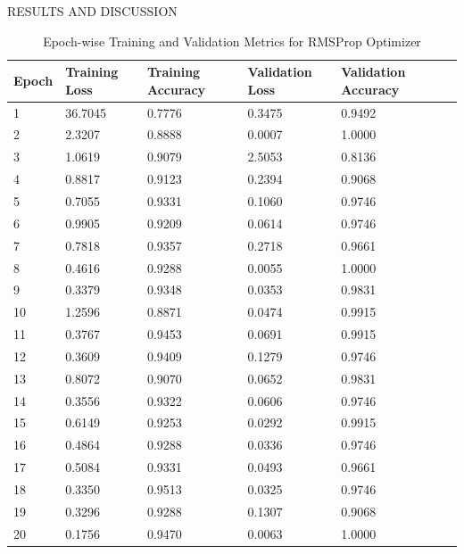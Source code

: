 \begin{section}[]{\uppercase{Results and Discussion}}
\begin{table}[H]
\centering
\begin{tabular}{llllll}
\toprule
\textbf{Epoch} & \textbf{Training Loss} & \textbf{Training Accuracy} & \textbf{Validation Loss} & \textbf{Validation Accuracy} \\ 
\midrule
    1  & 36.7045 & 0.7776 & 0.3475 & 0.9492 \\ 
    \midrule
    2  & 2.3207  & 0.8888 & 0.0007 & 1.0000 \\ 
    \midrule
    3  & 1.0619  & 0.9079 & 2.5053 & 0.8136 \\ 
    \midrule
    4  & 0.8817  & 0.9123 & 0.2394 & 0.9068 \\ 
    \midrule
    5  & 0.7055  & 0.9331 & 0.1060 & 0.9746 \\ 
    \midrule
    6  & 0.9905  & 0.9209 & 0.0614 & 0.9746 \\ 
    \midrule
    7  & 0.7818  & 0.9357 & 0.2718 & 0.9661 \\ 
    \midrule
    8  & 0.4616  & 0.9288 & 0.0055 & 1.0000 \\ 
    \midrule
    9  & 0.3379  & 0.9348 & 0.0353 & 0.9831 \\ 
    \midrule
    10 & 1.2596  & 0.8871 & 0.0474 & 0.9915 \\ 
    \midrule
    11 & 0.3767  & 0.9453 & 0.0691 & 0.9915 \\ 
    \midrule
    12 & 0.3609  & 0.9409 & 0.1279 & 0.9746 \\ 
    \midrule
    13 & 0.8072  & 0.9070 & 0.0652 & 0.9831 \\ 
    \midrule
    14 & 0.3556  & 0.9322 & 0.0606 & 0.9746 \\ 
    \midrule
    15 & 0.6149  & 0.9253 & 0.0292 & 0.9915 \\ 
    \midrule
    16 & 0.4864  & 0.9288 & 0.0336 & 0.9746 \\ 
    \midrule
    17 & 0.5084  & 0.9331 & 0.0493 & 0.9661 \\ 
    \midrule
    18 & 0.3350  & 0.9513 & 0.0325 & 0.9746 \\ 
    \midrule
    19 & 0.3296  & 0.9288 & 0.1307 & 0.9068 \\ 
    \midrule
    20 & 0.1756  & 0.9470 & 0.0063 & 1.0000 \\ 
\bottomrule
\end{tabular}
\caption{Epoch-wise Training and Validation Metrics for RMSProp Optimizer}
\label{table:results-b}
\end{table}


\end{section}
